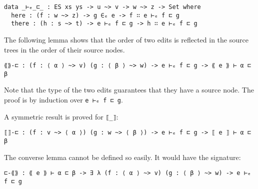 \documentclass[../Thesis.tex]{subfiles}
\begin{document}
\begin{verbatim}
data _⊢ₑ_⊏_ : ES xs ys -> u ~> v -> w ~> z -> Set where
  here : (f : w ~> z) -> g ∈ₑ e -> f ∷ e ⊢ₑ f ⊏ g 
  there : (h : s ~> t) -> e ⊢ₑ f ⊏ g -> h ∷ e ⊢ₑ f ⊏ g 
\end{verbatim}

	The following lemma shows that the order of two edits 
	is reflected in the source trees in the order of their source nodes.
\begin{verbatim}
⟪⟫-⊏ : (f : ⟨ α ⟩ ~> v) (g : ⟨ β ⟩ ~> w) -> e ⊢ₑ f ⊏ g -> ⟪ e ⟫ ⊢ α ⊏ β
\end{verbatim}
	Note that the type of the two edits guarantees that they have a source node.
	The proof is by induction over \texttt{e ⊢ₑ f ⊏ g}.

%
	
	A symmetric result is proved for \texttt{⟦\_⟧}:
\begin{verbatim}
⟦⟧-⊏ : (f : v ~> ⟨ α ⟩) (g : w ~> ⟨ β ⟩) -> e ⊢ₑ f ⊏ g -> ⟦ e ⟧ ⊢ α ⊏ β
\end{verbatim}
	
	The converse lemma cannot be defined so easily.
	It would have the signature:
\begin{verbatim}
⊏-⟪⟫ : ⟪ e ⟫ ⊢ α ⊏ β -> ∃ λ (f : ⟨ α ⟩ ~> v) (g : ⟨ β ⟩ ~> w) -> e ⊢ₑ f ⊏ g 
\end{verbatim}
	
\end{document}
